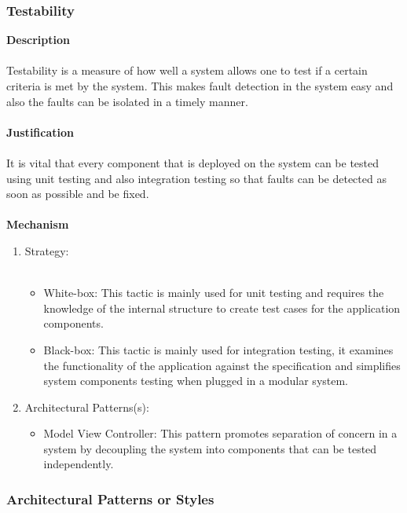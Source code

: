 \documentclass[hidelinks, 12pt, oneside]{article}
\begin{document}
			\subsubsection*{Testability}
			\textbf{Description}\\\\
			Testability is a measure of how well a system allows one to test if a certain criteria is met by the system. This makes fault detection in the system easy and also the faults can be isolated in a timely manner.\\\\
			\textbf{Justification}\\\\
			It is vital that every component that is deployed on the system can be tested using unit testing and also integration testing so that faults can be detected as soon as possible and be fixed. \\\\
			\textbf{Mechanism}
			\begin{enumerate}
				\item Strategy:\\\\
				\begin{itemize}
				\item White-box: This tactic is mainly used for unit testing and requires the knowledge of the internal structure to create test cases for the application components.
				\item Black-box: This tactic is mainly used for integration testing, it examines the functionality of the application against the specification and simplifies system components testing when plugged in a modular system.
				\end{itemize}
				\item Architectural Patterns(s):
				\begin{itemize}
				\item Model View Controller: This pattern promotes separation of concern in a system by decoupling the system into components that can be tested independently.   
				\end{itemize}
			\end{enumerate}	
    \newpage
    \subsubsection{Architectural Patterns or Styles}
\end{document}
